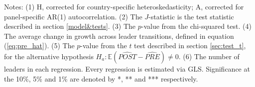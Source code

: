 \begin{table}[h]
{\begin{threeparttable}
\begin{tabular}{ccccccc}
 \hline                                                                                 
\end{tabular}
\begin{tablenotes}
	\footnotesize{Notes: (1) H, corrected for country-specific heteroskedasticity; A, corrected for panel-specific AR(1) autocorrelation. (2) The $J$-statistic is the test statistic described in section \ref{model&tests}. (3) The $p$-value from the chi-squared test. (4) The average change in growth across leader transitions, defined in equation (\ref{eq:pre_hat}). (5) The $p$-value from the $t$ test described in section \ref{sec:test_t}, for the alternative hypothesis $H_a: \mathds{E}(\widehat{POST}-\widehat{PRE} )\neq0$. (6) The number of leaders in each regression. Every regression is estimated via GLS. Significance at the 10\%, 5\% and 1\% are denoted by *, **  and *** respectively.}
	\end{tablenotes}
	\end{threeparttable}
}
\end{table}